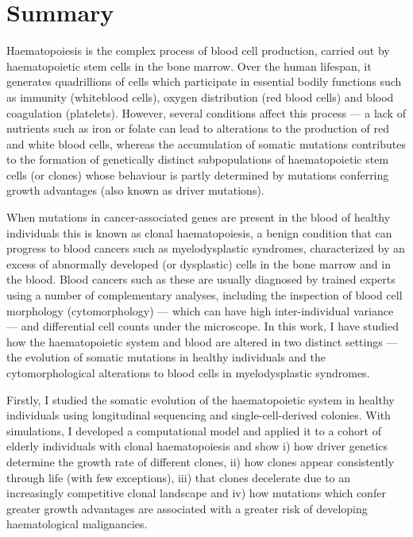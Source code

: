\chapter{Summary}

Haematopoiesis is the complex process of blood cell production, carried out by haematopoietic stem cells in the bone marrow. Over the human lifespan, it generates quadrillions of cells which participate in essential bodily functions such as immunity (whiteblood cells), oxygen distribution (red blood cells) and blood coagulation (platelets). However, several conditions affect this process --- a lack of nutrients such as iron or folate can lead to alterations to the production of red and white blood cells, whereas the accumulation of somatic mutations contributes to the formation of genetically distinct subpopulations of haematopoietic stem cells (or clones) whose behaviour is partly determined by mutations conferring growth advantages (also known as driver mutations). 

When mutations in cancer-associated genes are present in the blood of healthy individuals this is known as clonal haematopoiesis, a benign condition that can progress to blood cancers such as myelodysplastic syndromes, characterized by an excess of abnormally developed (or dysplastic) cells in the bone marrow and in the blood. Blood cancers such as these are usually diagnosed by trained experts using a number of complementary analyses, including the inspection of blood cell morphology (cytomorphology) --- which can have high inter-individual variance --- and differential cell counts under the microscope.
In this work, I have studied how the haematopoietic system and blood are altered in two distinct settings --- the evolution of somatic mutations in healthy individuals and the cytomorphological alterations to blood cells in myelodysplastic syndromes.

Firstly, I studied the somatic evolution of the haematopoietic system in healthy individuals using longitudinal sequencing and single-cell-derived colonies. With simulations, I developed a computational model and applied it to a cohort of elderly individuals with clonal haematopoiesis and show i) how driver genetics determine the growth rate of different clones, ii) how clones appear consistently through life (with few exceptions), iii) that clones decelerate due to an increasingly competitive clonal landscape and iv) how mutations which confer greater growth advantages are associated with a greater risk of developing haematological malignancies.

